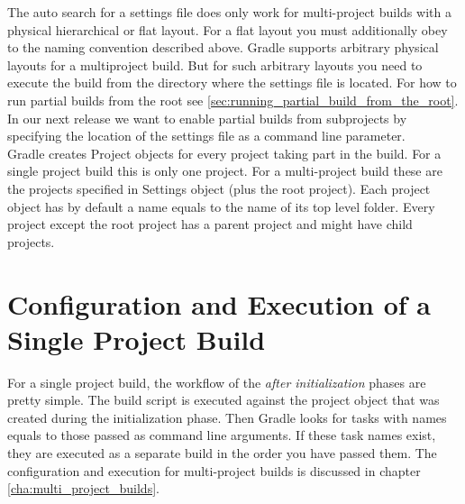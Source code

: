 The auto search for a settings file does only work for multi-project builds with a physical hierarchical or flat layout. For a flat layout you must additionally obey to the naming convention described above. Gradle supports arbitrary physical layouts for a multiproject build. But for such arbitrary layouts you need to execute the build from the directory where the settings file is located. For how to run partial builds from the root see \ref{sec:running_partial_build_from_the_root}. In our next release we want to enable partial builds from subprojects by specifying the location of the settings file as a command line parameter.
\\
Gradle creates Project objects for every project taking part in the build. For a single project build this is only one project. For a multi-project build these are the projects specified in Settings object (plus the root project). Each project object has by default a name equals to the name of its top level folder. Every project except the root project has a parent project and might have child projects.

\section{Configuration and Execution of a Single Project Build} %
\label{sec:configuration_and_execution_of_a_single_project_build}

For a single project build, the workflow of the \emph{after initialization} phases are pretty simple. The build script is executed against the project object that was created during the initialization phase. Then Gradle looks for tasks with names equals to those passed as command line arguments. If these task names exist, they are executed as a separate build in the order you have passed them. The configuration and execution for multi-project builds is discussed in chapter \ref{cha:multi_project_builds}.

